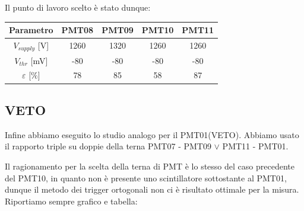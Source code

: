 \documentclass[10pt,a4paper]{article}
\begin{document}
\begin{figure}[H]
\begin{minipage}{0.48\textwidth}
\end{minipage}

\end{figure}

Il punto di lavoro scelto è stato dunque:

\begin{center}
\begin{tabular}{ccccc}
\toprule
Parametro & PMT08 & PMT09 & PMT10 & PMT11 \\
\midrule
$V_{supply}$ [V] & 1260  & 1320  & 1260  & 1260  \\
$V_{thr}$ [mV] & -80 & -80 & -80 & -80 \\
$\varepsilon$ [$\%$] & 78  & 85  & 58 & 87 \\
\bottomrule
\end{tabular}

\end{center}


\subsection{VETO}

Infine abbiamo eseguito lo studio analogo per il PMT01(VETO). Abbiamo usato il rapporto triple su doppie della terna PMT07 - PMT09 $\vee$ PMT11 - PMT01. 

Il ragionamento per la scelta della terna di PMT è lo stesso del caso precedente del PMT10, in quanto non è presente uno scintillatore sottostante al PMT01, dunque il metodo dei trigger ortogonali non ci è risultato ottimale per la misura.
Riportiamo sempre grafico e tabella: 
\end{document}
